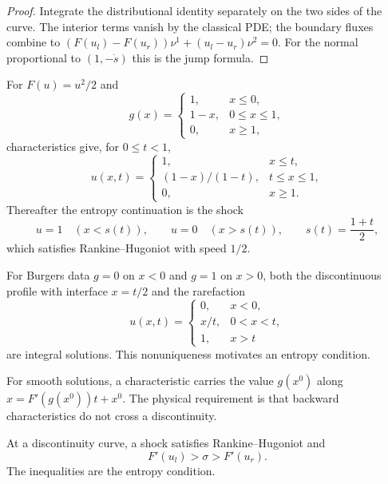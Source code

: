 \begin{proof}
\sketch Integrate the distributional identity separately on the two sides
of the curve. The interior terms vanish by the classical PDE; the boundary
fluxes combine to
$(F(u_l)-F(u_r))\nu^1+(u_l-u_r)\nu^2=0$. For the normal proportional to
$(1,-\dot s)$ this is the jump formula.
\end{proof}

\begin{example}
\label{ex:burgers-shock-formation}
For $F(u)=u^2/2$ and
\[
g(x)=\begin{cases}1,&x\le0,\\1-x,&0\le x\le1,\\0,&x\ge1,\end{cases}
\]
characteristics give, for $0\le t<1$,
\[
u(x,t)=\begin{cases}
1,&x\le t,\\
(1-x)/(1-t),&t\le x\le1,\\
0,&x\ge1.
\end{cases}
\]
Thereafter the entropy continuation is the shock
\[
u=1\quad(x<s(t)),\qquad u=0\quad(x>s(t)),\qquad s(t)=\frac{1+t}{2},
\]
which satisfies Rankine--Hugoniot with speed $1/2$.
\end{example}

\begin{example}
\label{ex:rarefaction-nonphysical-shock}
For Burgers data $g=0$ on $x<0$ and $g=1$ on $x>0$, both the discontinuous
profile with interface $x=t/2$ and the rarefaction
\[
u(x,t)=\begin{cases}0,&x<0,\\x/t,&0<x<t,\\1,&x>t\end{cases}
\]
are integral solutions. This nonuniqueness motivates an entropy condition.
\end{example}

For smooth solutions, a characteristic carries the value $g(x^0)$ along
$x=F'(g(x^0))t+x^0$. The physical requirement is that backward
characteristics do not cross a discontinuity.

\begin{definition}
\label{def:shock-entropy-condition}
At a discontinuity curve, a shock satisfies Rankine--Hugoniot and
\[
F'(u_l)>\sigma>F'(u_r).
\]
The inequalities are the entropy condition.
\end{definition}

